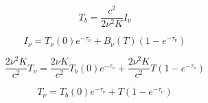 \documentclass[12pt]{article}
\begin{document}
\begin{equation}
T_b = \dfrac{c^2}{2\nu^2K}I_{\nu}
\end{equation}

\begin{equation}
I_{\nu} = T_{\nu} (0)  e^{-\tau_{\nu}} + B_{\nu}(T)(1- e^{-\tau_{\nu}})
\end{equation}

\begin{equation}
\dfrac{2 \nu^2 K}{c^2} T_{\nu} = \dfrac{2 \nu K}{c^2}T_b(0)e^{-\tau_{\nu}} + \dfrac{2 \nu^2 K}{c^2} T(1 - e^{-\tau_{\nu}})
\end{equation}

\begin{equation}
T_{\nu} = T_b (0)  e^{-\tau_{\nu}} + T(1- e^{-\tau_{\nu}}) 
\end{equation}
\end{document}
